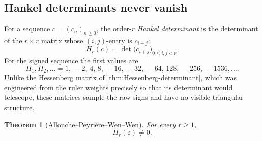 \documentclass[11pt,oneside]{article}
\numberwithin{equation}{section}
\newtheorem{theorem}{Theorem}[section]
\theoremstyle{definition}
\theoremstyle{remark}
\newcommand{\eps}{\varepsilon}
\begin{document}
\subsection{Hankel determinants never vanish}

For a sequence \(c=(c_n)_{n\ge0}\), the order-\(r\) \emph{Hankel
determinant} is the determinant of the \(r\times r\) matrix whose
\((i,j)\)-entry is \(c_{i+j}\):
\begin{equation}
  H_r(c)=\det\bigl(c_{i+j}\bigr)_{0\le i,j<r}.
  \label{eq:hankel-definition}
\end{equation}
For the signed sequence the first values are
\begin{equation}
  H_1,H_2,\ldots=
  1,\,-2,\,4,\,8,\,-16,\,-32,\,-64,\,128,\,-256,\,-1536,\ldots.
  \label{eq:hankel-first-values}
\end{equation}
Unlike the Hessenberg matrix of \cref{thm:Hessenberg-determinant}, which was
engineered from the ruler weights precisely so that its determinant would
telescope, these matrices sample the raw signs and have no visible
triangular structure.

\begin{theorem}[Allouche--Peyri\`ere--Wen--Wen]
\label{thm:hankel-nonzero}
For every \(r\ge1\),
\begin{equation}
  \boxed{H_r(\eps)\ne0.}
  \label{eq:hankel-nonzero}
\end{equation}
\end{theorem}
\end{document}
